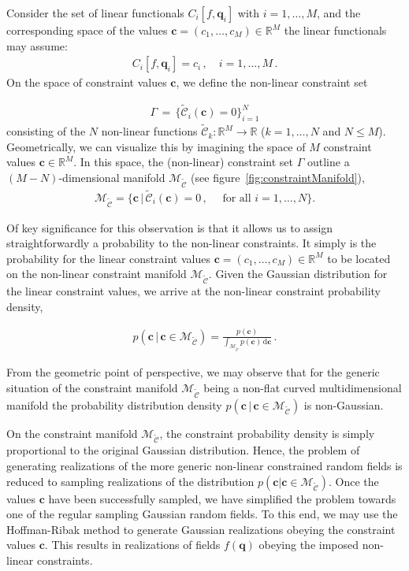 \documentclass[a4paper, 11pt]{article}
\begin{document}
\bigskip
Consider the set of linear functionals $C_i[f,\bm{q}_i]$ with $i=1,\dots,M$, and the corresponding space of the  values $\bm{c}=(c_1,\dots,c_M) \in \mathbb{R}^M$ the linear functionals may assume:
\begin{align}
  C_i[f,\bm{q}_i]=c_i\,,\quad i=1,\dots,M\,.
\end{align}
On the space of constraint values $\bm{c}$, we define the non-linear constraint set

\begin{align}
  \Gamma\, = \,\{\mathcal{\tilde C}_i(\bm{c}) = 0\}_{i=1}^N
\end{align}
consisting of the $N$ non-linear functions $\mathcal{\tilde C}_k:\mathbb{R}^M \to \mathbb{R}$ ($k=1,\dots,N$ and $N\leq M$). Geometrically, we can visualize this by imagining the space of $M$ constraint values  $\bm{c}\in \mathbb{R}^M$. In this space, the (non-linear) constraint set $\Gamma$ outline a $(M-N)$-dimensional manifold $\mathcal{M}_\mathcal{\tilde C}$
(see figure~\ref{fig:constraintManifold}),
\begin{align}
\mathcal{M}_{\mathcal{\tilde C}} = 
\{\bm{c}\, |\, \mathcal{\tilde C}_i(\bm{c}) = 0\,,\quad \text{ for all } i=1,\dots,N\}.
\end{align}
\bigskip

Of key significance for this observation is that it allows us to assign straightforwardly a probability to the non-linear constraints. It simply is the probability for the linear constraint values $\bm{c}=(c_1,\dots,c_M) \in \mathbb{R}^M$ to be located on the non-linear constraint manifold $\mathcal{M}_\mathcal{\tilde C}$. Given the Gaussian distribution for the linear constraint values, we arrive at the non-linear constraint probability density,

\begin{framed}
\begin{align}
p(\bm{c}\,|\,\bm{c}\in \mathcal{M}_{\mathcal{\tilde C}})  = \frac{p(\bm{c})}{\int_{\mathcal{M}_\mathcal{\tilde C}} p(\bm{c})\, \mathrm{d}\bm{c}}\,.
\end{align}
\end{framed}
From the geometric point of perspective, we may observe that for the generic situation of the constraint manifold $\mathcal{M}_{\mathcal{\tilde C}}$ being a non-flat curved multidimensional manifold the probability distribution density $p(\bm{c}\,|\,\bm{c}\in \mathcal{M}_{\mathcal{\tilde C}})$ is non-Gaussian.

On the constraint manifold $\mathcal{M}_\mathcal{\tilde C}$, the constraint probability density is simply proportional to the original Gaussian distribution. Hence, the problem of generating realizations of the more generic non-linear constrained random fields is reduced to sampling realizations of the distribution $p(\bm{c}|\bm{c}\in \mathcal{M}_\mathcal{\tilde C})$. Once the values ${\bm c}$ have been successfully sampled, we have simplified the problem towards one of the regular sampling Gaussian random fields. To this end, we may use the Hoffman-Ribak method \citep{Bertschinger:1987,Hoffman:1991,Weygaert:1996} to generate Gaussian realizations obeying the constraint values $\bm{c}$. This results in realizations of fields $f({\bm q})$ obeying the imposed non-linear constraints.
\end{document}
